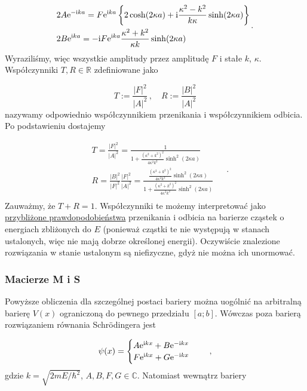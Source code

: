 \documentclass{myclass}
\begin{document}
\begin{equation*}
\begin{split}
    &2A\mathrm{e}^{-\mathrm{i} ka}=F\mathrm{e}^{\mathrm{i} ka}\left\{2\cosh(2\kappa a)+\mathrm{i}\frac{\kappa^2-k^2}{k\kappa}\sinh(2\kappa a)\right\}\\
    &2B\mathrm{e}^{\mathrm{i} ka}=-\mathrm{i} F\mathrm{e}^{\mathrm{i} ka}\frac{\kappa^2+k^2}{\kappa k}\sinh(2\kappa a)
\end{split}\,.
\end{equation*}
Wyraziliśmy, więc wszystkie amplitudy przez amplitudę \(F\) i stałe \(k\), \(\kappa\). Współczynniki
\(T,R\in\mathbb{R}\) zdefiniowane jako

\begin{equation*}
T:=\frac{|F|^2}{|A|^2}\,,\quad R:=\frac{|B|^2}{|A|^2}
\end{equation*}
nazywamy odpowiednio współczynnikiem przenikania i współczynnikiem odbicia. Po podstawieniu
dostajemy

\begin{equation*}
\begin{split}
&T=\frac{|F|^2}{|A|^2}=\frac{1}{1+\frac{(\kappa^2+k^2)^2}{4\kappa^2 k^2}\sinh^2(2\kappa a)}\\
&R=\frac{|B|^2}{|F|^2}\frac{|F|^2}{|A|^2}=\frac{\frac{(\kappa^2+k^2)^2}{4\kappa^2 k^2}\sinh^2(2\kappa a)}{1+\frac{(\kappa^2+k^2)^2}{4\kappa^2 k^2}\sinh^2(2\kappa a)}\\
\end{split}\quad\,.
\end{equation*}
Zauważmy, że \(\boxed{T+R=1}\). Współczynniki te możemy interpretować jako \underline{przybliżone
prawdopodobieństwa} przenikania i odbicia na barierze cząstek o energiach zbliżonych do \(E\)
(ponieważ cząstki te nie występują w stanach ustalonych, więc nie mają dobrze określonej energii).
Oczywiście znalezione rozwiązania w stanie ustalonym są niefizyczne, gdyż nie można ich unormować.

\subsubsection{Macierze M i S}

Powyższe obliczenia dla szczególnej postaci bariery można uogólnić na arbitralną barierę \(V(x)\)
ograniczoną do pewnego przedziału \([a;b]\). Wówczas poza barierą rozwiązaniem równania
Schr{\"o}dingera jest

\begin{equation*}
\psi(x)=\begin{cases}
A\mathrm{e}^{\mathrm{i} kx}+B\mathrm{e}^{-\mathrm{i} kx}\\
F\mathrm{e}^{\mathrm{i} kx}+G\mathrm{e}^{-\mathrm{i} kx}
\end{cases}\quad\,,
\end{equation*}
gdzie \(k=\sqrt{2mE/\hbar^2}\), \(A,B,F,G\in\mathbb{C}\). Natomiast wewnątrz bariery
\end{document}
